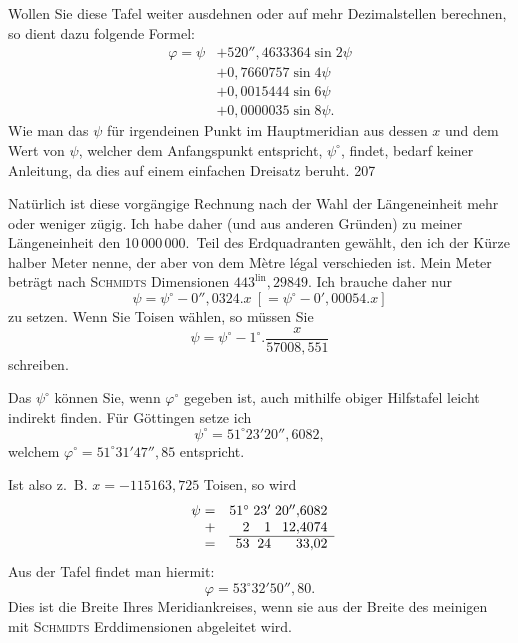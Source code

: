 Wollen Sie diese Tafel weiter ausdehnen oder auf mehr Dezimalstellen berechnen, so dient dazu folgende Formel:
\[
\begin{aligned}
\varphi=\psi&+520''{,}4633364\sin2\psi\\
&+0{,}7660757\sin4\psi\\
&+0{,}0015444\sin6\psi\\
&+0{,}0000035\sin8\psi.
\end{aligned}
\]
Wie man das $\psi$ für irgendeinen Punkt im Hauptmeridian aus dessen $x$ und dem Wert von $\psi$, welcher dem Anfangspunkt entspricht, $\psi^\circ$, findet, bedarf keiner Anleitung, da dies auf einem einfachen Dreisatz beruht.
\clearpage
{}\hfill207\par\medskip
Natürlich ist diese vorgängige Rechnung nach der Wahl der Längeneinheit mehr oder weniger zügig. Ich habe daher (und aus anderen Gründen) zu meiner Längeneinheit den 10\,000\,000.~Teil des Erdquadranten gewählt, den ich der Kürze halber Meter nenne, der aber von dem Mètre légal verschieden ist. Mein Meter beträgt nach \textsc{Schmidts} Dimensionen $443^{\mathrm{lin}}{,}29849$. Ich brauche daher nur
\[
\psi=\psi^\circ-0''{,}0324.x\ [=\psi^\circ-0'{,}00054.x]
\]
zu setzen. Wenn Sie Toisen wählen, so müssen Sie
\[
\psi=\psi^\circ-1^\circ.\frac{x}{57008{,}551}
\]
schreiben.

Das $\psi^\circ$ können Sie, wenn $\varphi^\circ$ gegeben ist, auch mithilfe obiger Hilfstafel leicht indirekt finden. Für Göttingen setze ich
\[
\psi^\circ=51^\circ23'20''{,}6082,
\]
welchem $\varphi^\circ=51^\circ31'47''{,}85$ entspricht.

Ist also z.~B. $x=-115163{,}725$ Toisen, so wird
\[
\begin{array}{r@{\quad}r@{\;}r@{\;}r}
\psi=&51^\circ&23'&20''{,}6082\\
+&2&1&12{,}4074\\\cline{2-4}
=&53&24&33{,}02
\end{array}
\]
Aus der Tafel findet man hiermit:
\[
\varphi=53^\circ32'50''{,}80.
\]
Dies ist die Breite Ihres Meridiankreises, wenn sie aus der Breite des meinigen mit \textsc{Schmidts} Erddimensionen abgeleitet wird.

